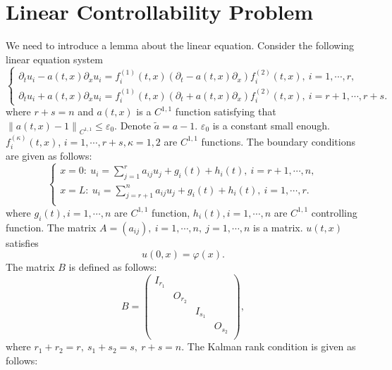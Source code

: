 \documentclass[a4paper,reqno,11pt]{amsart}
\numberwithin{equation}{section} %
\begin{document}
\section{Linear Controllability Problem}
We need to introduce a lemma about the linear equation. Consider the following linear equation system
\begin{equation}\label{e1}
	\left\{\begin{array}{l}
	\partial_t u_i- a(t,x)\partial_x u_i=f^{(1)}_i(t,x)(\partial_t - a(t,x)\partial_x)f^{(2)}_i(t,x),\ i=1, \cdots, r, \\
	\partial_t u_i+ a(t,x)\partial_x u_i=f^{(1)}_i(t,x)(\partial_t + a(t,x)\partial_x)f^{(2)}_i(t,x),\ i=r+1, \cdots, r+s.
	\end{array}\right.
\end{equation}
where $r+s=n$ and $a(t,x)$ is a $C^{1,1}$ function satisfying that $\left\lVert a(t,x)-1\right\rVert _{C^{1,1}} \leq \varepsilon _0$. Denote $\tilde{a}=a-1 $.  $\varepsilon _0$ is a constant small enough. $f^{(\kappa )}_i(t,x)$, $i=1,\cdots,r+s,\kappa =1,2$ are $C^{1,1}$ functions. The boundary conditions are given as follows:
\begin{equation}\label{e2}
	\left\{ \begin{array}{l}
		x=0:\ u_i=\sum_{j=1}^r{a_{ij}u_j + g_i(t) + h_i\left( t \right) ,\ i=r+1,\cdots ,n,}\\
		x=L:\ u_i=\sum_{j=r+1}^n{a_{ij}u_j +g_i(t) + h_i\left( t \right) ,\ i=1,\cdots ,r.}\\
	\end{array} \right. 
\end{equation}
where $g_i(t), i=1,\cdots, n$ are $C^{1,1}$ function, $h_i(t), i=1,\cdots, n$ are $C^{1,1}$ controlling function. The matrix $A=\left( a_{ij} \right) ,\ i=1,\cdots ,n,\ j=1,\cdots ,n$ is a matrix. $u(t,x)$ satisfies
\begin{equation}\label{4}
	u\left( 0,x \right) =\varphi \left( x \right) .
\end{equation}
The matrix $B$ is defined as follows:
$$
B=\left( \begin{matrix}
	I_{r_1}&		&		&		\\
	&		O_{r_2}&		&		\\
	&		&		I_{s_1}&		\\
	&		&		&		O_{s_2}\\
\end{matrix} \right) ,
$$
where $r_1 +r_2 =r,\ s_1+s_2=s,\ r+s=n $. The Kalman rank condition is given as follows:
\end{document}
